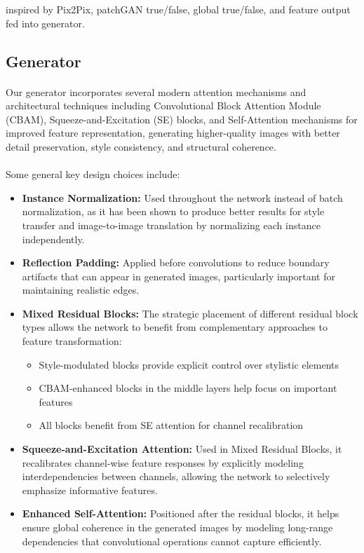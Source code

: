 \documentclass[twoside,english,notitlepage]{report}
\begin{document}
inspired by Pix2Pix, patchGAN true/false, global true/false, and feature output fed into generator. 


\subsection{Generator}
\paragraph{} Our generator incorporates several modern attention mechanisms and architectural techniques including Convolutional Block Attention Module (CBAM), Squeeze-and-Excitation (SE) blocks, and Self-Attention mechanisms for improved feature representation, generating higher-quality images with better detail preservation, style consistency, and structural coherence.

\paragraph{} Some general key design choices include:
\begin{itemize}
    \item \textbf{Instance Normalization:} Used throughout the network instead of batch normalization, as it has been shown to produce better results for style transfer and image-to-image translation by normalizing each instance independently.

    \item \textbf{Reflection Padding:} Applied before convolutions to reduce boundary artifacts that can appear in generated images, particularly important for maintaining realistic edges.

    \item \textbf{Mixed Residual Blocks:} The strategic placement of different residual block types allows the network to benefit from complementary approaches to feature transformation:

    \begin{itemize}
        \item Style-modulated blocks provide explicit control over stylistic elements
        \item CBAM-enhanced blocks in the middle layers help focus on important features
        \item All blocks benefit from SE attention for channel recalibration
    \end{itemize}

    \item \textbf{Squeeze-and-Excitation Attention:} Used in Mixed Residual Blocks, it recalibrates channel-wise feature responses by explicitly modeling interdependencies between channels, allowing the network to selectively emphasize informative features.

    \item \textbf{Enhanced Self-Attention:} Positioned after the residual blocks, it helps ensure global coherence in the generated images by modeling long-range dependencies that convolutional operations cannot capture efficiently.

\end{itemize}
\end{document}
